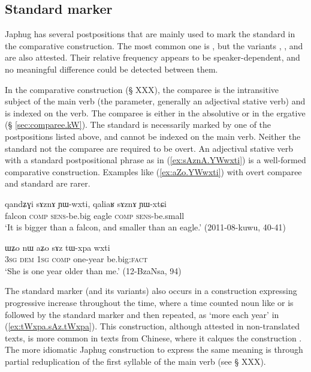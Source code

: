 \subsection{Standard marker} \label{sec:comparative} 
Japhug has several postpositions that are mainly used to mark the standard in the comparative construction. The most common one is , but the variants , ,  and  are also attested. Their relative frequency appears to be speaker-dependent, and no meaningful difference could be detected between them. 

In the comparative construction (§ XXX), the comparee is the intransitive subject of the main verb (the parameter, generally an adjectival stative verb) and is indexed on the verb. The comparee is either in the absolutive or in the ergative (§ \ref{sec:comparee.kW}). The standard is necessarily marked by one of the postpositions listed above, and cannot be indexed on the main verb. Neither the standard not the comparee are required to be overt. An adjectival stative verb with a standard postpositional phrase as in  (\ref{ex:sAznA.YWwxti})  is a well-formed comparative construction. Examples like (\ref{ex:aZo.YWwxti}) with overt comparee and standard are rarer.

\begin{exe}
\ex \label{ex:sAznA.YWwxti}
\gll  qandʑɣi sɤznɤ ɲɯ-wxti, qaliaʁ sɤznɤ ɲɯ-xtɕi \\
falcon \textsc{comp} \textsc{sens}-be.big eagle \textsc{comp} \textsc{sens}-be.small \\
\glt `It is bigger than a falcon, and smaller than an eagle.' (2011-08-kuwu, 40-41)
\end{exe}

\begin{exe}
\ex \label{ex:aZo.YWwxti}
\gll ɯʑo nɯ aʑo sɤz tɯ-xpa wxti  \\
\textsc{3sg} \textsc{dem} \textsc{1sg} \textsc{comp} one-year be.big:\textsc{fact} \\
\glt `She is one year older than me.' (12-BzaNsa, 94)
\end{exe}

The standard marker  (and its variants) also occurs in a  construction expressing progressive increase throughout the time, where a time counted noun like  or  is followed by the standard marker and then repeated, as  `more each year' in (\ref{ex:tWxpa.sAz.tWxpa}). This construction, although attested in non-translated texts, is more common in texts from Chinese, where it calques the construction . The more idiomatic Japhug construction to express the same meaning is through partial reduplication of the first syllable of the main verb (see § XXX).
 
